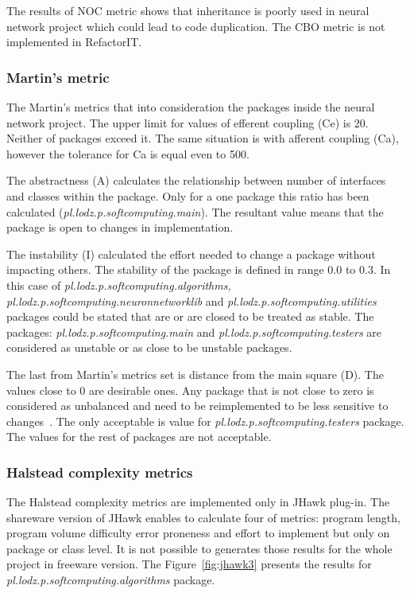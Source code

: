 The results of \ac{NOC} metric shows that inheritance is poorly used in neural network project which could lead to code duplication. The \ac{CBO} metric is not implemented in RefactorIT.

\subsubsection*{Martin's metric}
The Martin's metrics that into consideration the packages inside the neural network project. The upper limit for values of efferent coupling (\ac{Ce}) is 20. Neither of packages exceed it. The same situation is with afferent coupling (\ac{Ca}), however the tolerance for \ac{Ca} is equal even to 500. 

The abstractness (\ac{A}) calculates the relationship between number of interfaces and classes within the package. Only for a one package this ratio has been calculated (\textit{pl.lodz.p.soft\-com\-pu\-ting.main}). The resultant value means that the package is open to changes in implementation.

The instability (\ac{I}) calculated the effort needed to change a package without impacting others. The stability of the package is defined in range 0.0 to 0.3. In this case of \textit{pl.lodz.p.soft\-com\-pu\-ting.al\-go\-rithms, pl.lodz.p.soft\-com\-pu\-ting.neu\-ron\-net\-work\-lib} and \textit{pl.\-lodz.\-p.\-soft\-com\-pu\-ting.u\-ti\-li\-ties} packages could be stated that are or are closed to be treated as stable. The packages: \textit{pl.lodz.p.soft\-com\-pu\-ting.main} and \textit{pl.lodz.p.soft\-com\-pu\-ting.tes\-ters} are considered as unstable or as close to be unstable packages.

The last from Martin's metrics set is distance from the main square (\ac{D}). The values close to 0 are desirable ones. Any package that is not close to zero is considered as unbalanced and need to be reimplemented to be less sensitive to changes~\cite{martin}. The only acceptable is value for \textit{pl.lodz.p.soft\-com\-pu\-ting.tes\-ters} package. The values for the rest of packages are not acceptable. 

\subsubsection*{Halstead complexity metrics}
The Halstead complexity metrics are implemented only in JHawk plug-in. The shareware version of JHawk enables to calculate four of metrics: program length, program volume difficulty error proneness and effort to implement but only on package or class level. It is not possible to generates those results for the whole project in freeware version. The Figure~\ref{fig:jhawk3} presents the results for  \textit{pl.lodz.p.soft\-com\-pu\-ting.al\-go\-rithms} package. 

